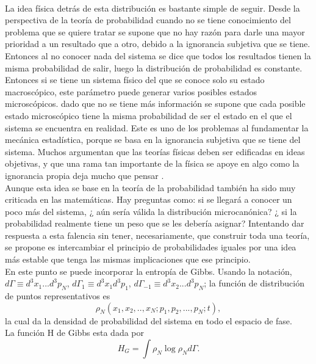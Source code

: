 \\
La idea física detrás de esta distribución es bastante simple de seguir. Desde la perspectiva de la teoría de probabilidad cuando no se tiene conocimiento del problema que se quiere tratar se supone que no hay razón para darle una mayor prioridad a un resultado que a otro, debido a la ignorancia subjetiva que se tiene. Entonces al no conocer nada del sistema se dice que todos los resultados tienen la misma probabilidad de salir, luego la distribución de probabilidad es constante.
\\
Entonces si se tiene un sistema físico del que se conoce solo su estado macroscópico, este parámetro puede generar varios posibles estados microscópicos. dado que no se tiene más información se supone que cada posible estado microscópico tiene la misma probabilidad de ser el estado en el que el sistema se encuentra en realidad. Este es uno de los problemas al fundamentar la mecánica estadística, porque se basa en la ignorancia subjetiva que se tiene del sistema. Muchos argumentan que las teorías físicas deben ser edificadas en ideas objetivas, y que una rama tan importante de la física se apoye en algo como la ignorancia propia deja mucho que pensar \cite{Penrose}.
\\
Aunque esta idea se base en la teoría de la probabilidad también ha sido muy criticada en las matemáticas. Hay preguntas como: si se llegará a conocer un poco más del sistema, ¿ aún sería válida la distribución microcanónica? ¿ si la probabilidad realmente tiene un peso que se les debería asignar? Intentando dar respuesta a esta falencia sin tener, necesariamente,   que construir toda una teoría, se propone es intercambiar el principio de probabilidades iguales por una idea más estable que tenga las mismas implicaciones que ese principio.
\\
En este punto se puede incorporar la entropía de Gibbs. Usando la notación, $d\Gamma \equiv d^{3}x_{1}...d^{3}p_{N}$, $d\Gamma_{1} \equiv d^{3}x_{1}d^{3}p_{1}$, $d\Gamma_{-1} \equiv d^{3}x_{2}...d^{3}p_{N}$; la función de distribución de puntos representativos es
\begin{equation}
\rho_{N}(x_{1},x_{2},..,x_{N};p_{1},p_{2},...,p_{N};t),
\end{equation}
la cual da la densidad de probabilidad del sistema en todo  el espacio de fase. 
\\
La función H de Gibbs esta dada por
\begin{equation}
H_{G}= \int \rho_{N} \log \rho_{N} d \Gamma.
\end{equation}
